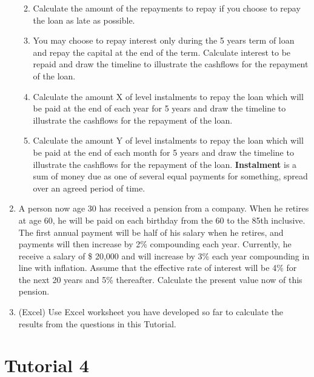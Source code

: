 \documentclass[
]{article}
\theoremstyle{definition}
\theoremstyle{definition}
\theoremstyle{definition}
\theoremstyle{definition}
\theoremstyle{remark}
\begin{document}
\begin{enumerate}
  \begin{enumerate}
  \def\labelenumii{\arabic{enumii}.}
  \item
    Calculate the amount of the repayments to repay if you choose to
    repay the loan as late as possible.
  \item
    You may choose to repay interest only during the 5 years term of
    loan and repay the capital at the end of the term. Calculate
    interest to be repaid and draw the timeline to illustrate the
    cashflows for the repayment of the loan.
  \item
    Calculate the amount X of level instalments to repay the loan
    which will be paid at the end of each year for 5 years and draw
    the timeline to illustrate the cashflows for the repayment of
    the loan.
  \item
    Calculate the amount Y of level instalments to repay the loan
    which will be paid at the end of each month for 5 years and draw
    the timeline to illustrate the cashflows for the repayment of
    the loan. \textbf{Instalment} is a sum of money due as one of several
    equal payments for something, spread over an agreed period of
    time.
  \end{enumerate}
\item
  A person now age 30 has received a pension from a company. When he
  retires at age 60, he will be paid on each birthday from the 60 to
  the 85th inclusive. The first annual payment will be half of his
  salary when he retires, and payments will then increase by 2\%
  compounding each year. Currently, he receive a salary of \$ 20,000
  and will increase by 3\% each year compounding in line with
  inflation. Assume that the effective rate of interest will be 4\% for
  the next 20 years and 5\% thereafter. Calculate the present value now
  of this pension.
\item
  (Excel) Use Excel worksheet you have developed so far to calculate
  the results from the questions in this Tutorial.
\end{enumerate}

\hypertarget{tutorial-4}{%
\section{Tutorial 4}\label{tutorial-4}}
\end{document}
